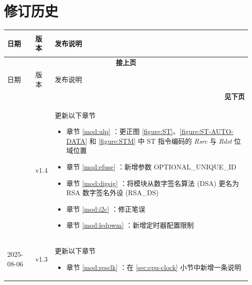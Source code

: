 \section*{修订历史}\label{revision-history}
\rhead{\Navigation}

\begin{longtable}[l]{ | m{2cm} | m{1.5cm} | m{12cm} | }\hline

    \rowcolor{lightgray}
    日期 & 版本 & \hypertarget{Release notes}{发布说明}\\\hline
    \endfirsthead

    \multicolumn{3}{c}{\bfseries 接上页}\\\hline
    \rowcolor{lightgray}
    日期 & 版本 & 发布说明\\\hline
    \endhead

    \multicolumn{3}{r}{\textbf{见下页}}\\
    \endfoot

    \endlastfoot

     & v1.4 &
    更新以下章节
    \begin{itemize}
        \item 章节 \ref{mod:ulp} \textit{\nameref{mod:ulp}}：更正图 \ref{figure:ST}、\ref{figure:ST-AUTO-DATA} 和 \ref{figure:STM} 中 ST 指令编码的 \textit{Rsrc} 与 \textit{Rdst} 位域位置 %
        \item 章节 \ref{mod:efuse} \textit{\nameref{mod:efuse}}：新增参数 OPTIONAL\_UNIQUE\_ID %
        \item 章节 \ref{mod:digsig} \textit{\nameref{mod:digsig}}：将模块从数字签名算法 (DSA) 更名为 RSA 数字签名外设 (RSA\_DS) %
        \item 章节 \ref{mod:i2c} \textit{\nameref{mod:i2c}}：修正笔误 %
        \item 章节 \ref{mod:ledpwm} \textit{\nameref{mod:ledpwm}}：新增定时器配置限制 %
    \end{itemize}
    \\\hline
    2025-08-06 & v1.3 &
    更新以下章节
    \begin{itemize}
        \item  章节 \ref{mod:resclk} \textit{\nameref{mod:resclk}}：在 \ref{sec:cpu-clock} \textit{\nameref{sec:cpu-clock}} 小节中新增一条说明
    \end{itemize}


\end{longtable}
